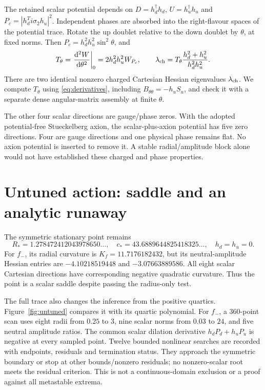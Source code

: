\documentclass[11pt,letterpaper]{article}
\newcommand{\dd}{\mathrm d}\newcommand{\Lam}{\Lambda}\newcommand{\B}{\mathcal B}\newcommand{\HH}{\mathcal H}
\begin{document}
The retained scalar potential depends on $D=h_d^\dagger h_d$, $U=h_u^\dagger h_u$ and $P_c=|h_d^Ti\sigma_2h_u|^2$. Independent phases are absorbed into the right-flavour spaces of the potential trace. Rotate the up doublet relative to the down doublet by $\theta$, at fixed norms. Then $P_c=h_d^2h_u^2\sin^2\theta$, and
\begin{equation}
 T_\theta=\left.\frac{\dd^2W}{\dd\theta^2}\right|_0=2h_d^2h_u^2W_{P_c},\qquad
 \lambda_{\rm ch}=T_\theta\frac{h_d^2+h_u^2}{h_d^2h_u^2}.
 \label{eq:charged}
\end{equation}
There are two identical nonzero charged Cartesian Hessian eigenvalues $\lambda_{\rm ch}$. We compute $T_\theta$ using \eqref{eq:derivatives}, including $B_{\theta\theta}=-h_uS_u$, and check it with a separate dense angular-matrix assembly at finite $\theta$.

The other four scalar directions are gauge/phase zeros. With the adopted potential-free Stueckelberg axion, the scalar-plus-axion potential has five zero directions. Four are gauge directions and one physical phase remains flat. No axion potential is inserted to remove it. A stable radial/amplitude block alone would not have established these charged and phase properties.

\section{Untuned action: saddle and an analytic runaway}

The symmetric stationary point remains
\begin{equation}
 R_*=1.278472412043978650\ldots,\quad c_*=43.6889644825418325\ldots,\quad h_d=h_u=0.
\end{equation}
For $f_-$, its radial curvature is $K_f=11.7176182432$, but its neutral-amplitude Hessian entries are $-4.10218519448$ and $-3.07663889586$. All eight scalar Cartesian directions have corresponding negative quadratic curvature. Thus the point is a scalar saddle despite passing the radius-only test.

The full trace also changes the inference from the positive quartics. Figure~\ref{fig:untuned} compares it with its quartic polynomial. For $f_-$, a 360-point scan uses eight radii from $0.25$ to $3$, nine scalar norms from $0.03$ to $24$, and five neutral amplitude ratios. The common scalar dilation derivative $h_dP_d+h_uP_u$ is negative at every sampled point. Twelve bounded nonlinear searches are recorded with endpoints, residuals and termination status. They approach the symmetric boundary or stop at other bounds/nonzero residuals; no nonzero-scalar root meets the residual criterion. This is not a continuous-domain exclusion or a proof against all metastable extrema.
\end{document}
